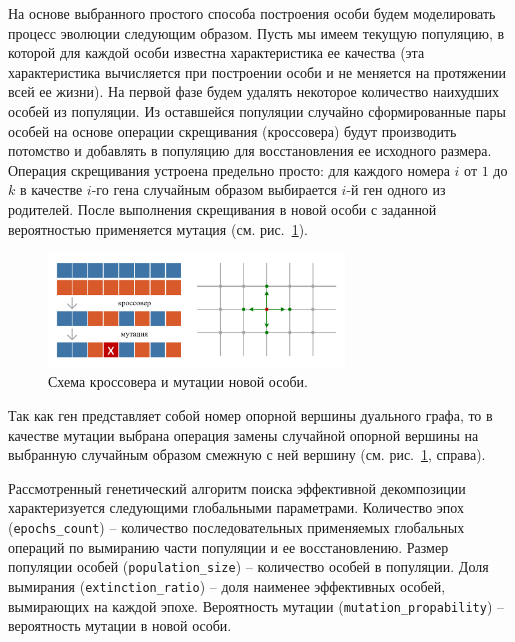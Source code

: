 На основе выбранного простого способа построения особи будем моделировать процесс эволюции следующим образом.
Пусть мы имеем текущую популяцию, в которой для каждой особи известна характеристика ее качества (эта характеристика вычисляется при построении особи и не меняется на протяжении всей ее жизни).
На первой фазе будем удалять некоторое количество наихудших особей из популяции.
Из оставшейся популяции случайно сформированные пары особей на основе операции скрещивания (кроссовера) будут производить потомство и добавлять в популяцию для восстановления ее исходного размера.
Операция скрещивания устроена предельно просто: для каждого номера $i$ от $1$ до $k$ в качестве $i$-го гена случайным образом выбирается $i$-й ген одного из родителей.
После выполнения скрещивания в новой особи с заданной вероятностью применяется мутация (см. рис.~\ref{fig:text_2_genetic_cross_mut}).

\begin{figure}[ht]
\centering
\includegraphics[width=0.7\textwidth]{fig/par_gen_cross-mut.pdf}
\singlespacing
{}\caption{Схема кроссовера и мутации новой особи.}
\label{fig:text_2_genetic_cross_mut}
\end{figure}

Так как ген представляет собой номер опорной вершины дуального графа, то в качестве мутации выбрана операция замены случайной опорной вершины на выбранную случайным образом смежную с ней вершину (см. рис.~\ref{fig:text_2_genetic_cross_mut}, справа).

Рассмотренный генетический алгоритм поиска эффективной декомпозиции характеризуется следующими глобальными параметрами.
Количество эпох (\texttt{epochs\_count}) -- количество последовательных применяемых глобальных операций по вымиранию части популяции и ее восстановлению.
Размер популяции особей (\texttt{population\_size}) -- количество особей в популяции.
Доля вымирания (\texttt{extinction\_ratio}) – доля наименее эффективных особей, вымирающих на каждой эпохе.
Вероятность мутации (\texttt{mutation\_propability}) -- вероятность мутации в новой особи.

